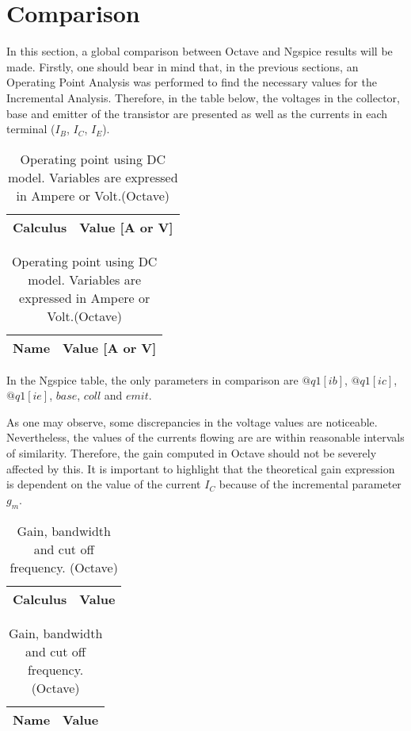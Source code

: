\section{Comparison}
\label{section:comparison}

\par In this section, a global comparison between Octave and Ngspice results will be made. Firstly, one should bear in mind that, in the previous sections, an Operating Point Analysis was performed to find the necessary values for the Incremental Analysis. Therefore, in the table below, the voltages in the collector, base and emitter of the transistor are presented as well as the currents in each terminal ($I_{B}$, $I_{C}$, $I_{E}$).

\begin{table}[ht]
\parbox{.45\linewidth}{
  \centering
  \begin{tabular}{|l|r|}
    \hline    
    {\bf Calculus} & {\bf Value [A or V]} \\ \hline
    
  \end{tabular}
  \caption{Operating point using DC model. Variables are expressed in Ampere or Volt. (Ngspice)}} 
\parbox{.45\linewidth}{
 \centering
  \begin{tabular}{|l|r|}
    \hline    
    {\bf Name} & {\bf Value [A or V]} \\ \hline
    
  \end{tabular}
  \caption{Operating point using DC model. Variables are expressed in Ampere or Volt.(Octave)}}
\end{table}

In the Ngspice table, the only parameters in comparison are $@q1[ib]$, $@q1[ic]$, $@q1[ie]$, $base$, $coll$ and $emit$.
\par As one may observe, some discrepancies in the voltage values are noticeable. Nevertheless, the values of the currents flowing are are within reasonable intervals of similarity. Therefore, the gain computed in Octave should not be severely affected by this. It is important to highlight that the theoretical gain expression is dependent on the value of the current $I_{C}$ because of the incremental parameter $g_{m}$. 
\newpage
 \begin{table}[h]
\parbox{.45\linewidth}{
  \centering
  \begin{tabular}{|l|r|}
    \hline    
    {\bf Calculus} & {\bf Value} \\ \hline
    
  \end{tabular}
  \caption{Gain, bandwidth and cut off frequency. (Ngspice)}} 
\parbox{.45\linewidth}{
 \centering
  \begin{tabular}{|l|r|}
    \hline    
    {\bf Name} & {\bf Value} \\ \hline
    
  \end{tabular}
  \caption{Gain, bandwidth and cut off frequency. (Octave)}}
\end{table}

